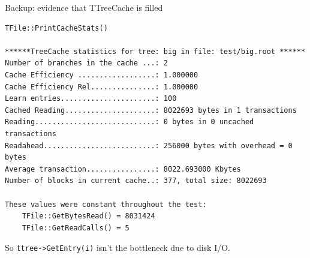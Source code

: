 \documentclass{beamer}
\begin{document}
\begin{frame}[fragile]{Backup: evidence that TTreeCache is filled}
\scriptsize
\begin{lstlisting}
TFile::PrintCacheStats()

******TreeCache statistics for tree: big in file: test/big.root ******
Number of branches in the cache ...: 2
Cache Efficiency ..................: 1.000000
Cache Efficiency Rel...............: 1.000000
Learn entries......................: 100
Cached Reading.....................: 8022693 bytes in 1 transactions
Reading............................: 0 bytes in 0 uncached transactions
Readahead..........................: 256000 bytes with overhead = 0 bytes
Average transaction................: 8022.693000 Kbytes
Number of blocks in current cache..: 377, total size: 8022693

These values were constant throughout the test:
    TFile::GetBytesRead() = 8031424
    TFile::GetReadCalls() = 5
\end{lstlisting}

\small So {\tt\small ttree->GetEntry(i)} isn't the bottleneck due to disk I/O.
\end{frame}
\end{document}
